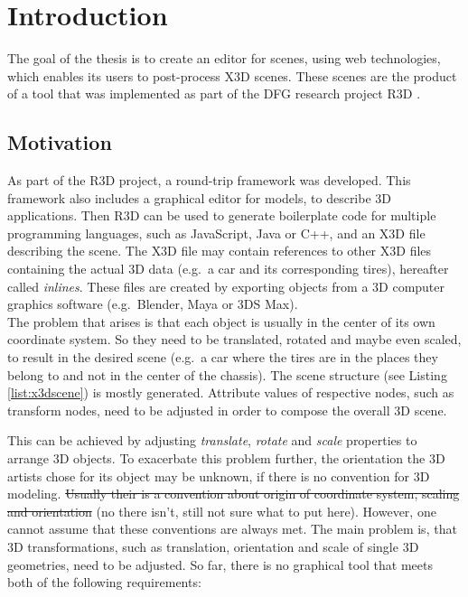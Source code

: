 
\section{Introduction}
\label{sec:Prelude}

The goal of the thesis is to create an editor for  scenes, using web technologies,
which enables its users to post-process \gls{X3D} scenes. These scenes are the
product of a tool that was implemented as part of the DFG research
project \gls{R3D} \cite{Jung:2015:SDA:2802768.2802837}.
\subsection{Motivation}\label{motivation}

As part of the \gls{R3D} project, a round-trip framework
was developed. This framework also includes a
graphical editor for  \cite{Lenk:2012:MID:2338714.2338742} models, to describe \gls{3D} applications. Then
\gls{R3D} can be used to generate boilerplate code for multiple programming
languages, such as JavaScript, Java or C++, and an \gls{X3D} file describing
the scene. The \gls{X3D} file may contain references to other \gls{X3D} files
containing the actual \gls{3D} data (e.g.~a car and its corresponding tires),
hereafter called \emph{inlines}. These files are created by exporting
objects from a \gls{3D} computer graphics software (e.g.~Blender,
Maya or 3DS Max).\\
The problem that arises is that each object is usually in the center of
its own coordinate system. So they need to be translated, rotated and
maybe even scaled, to result in the desired scene (e.g.~a car where the tires
are in the places they belong to and not in the center of the chassis).
The scene structure (see Listing \ref{list:x3dscene}) is mostly generated. Attribute values of respective nodes,
such as transform nodes, need to be adjusted in order to compose the
overall \gls{3D} scene.


This can be achieved by adjusting \emph{translate}, \emph{rotate} and
\emph{scale} properties to arrange \gls{3D} objects. To exacerbate this problem
further, the orientation the \gls{3D} artists chose for its object may be unknown, if
there is no convention for \gls{3D} modeling. \sout{Usually their is a convention
about origin of coordinate system, scaling and orientation} (no there isn't, still
not sure what to put here). However, one cannot assume that these conventions are
always met. The main problem is, that \gls{3D} transformations, such as translation,
orientation and scale of single \gls{3D} geometries, need to be adjusted. So far,
there is no graphical tool that meets both of the following requirements:


